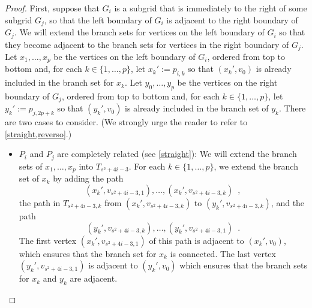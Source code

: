 \documentclass[kpfonts,lotsofwhite]{patmorin}
\theoremstyle{plain}
\theoremstyle{definition}
\begin{document}
\begin{proof}
  First, suppose that $G_i$ is a subgrid that is immediately to the right of some subgrid $G_j$, so that the left boundary of $G_i$ is adjacent to the right boundary of $G_j$.  We will extend the branch sets for vertices on the left boundary of $G_i$ so that they become adjacent to the branch sets for vertices in the right boundary of $G_j$. Let $x_1,\ldots,x_p$ be the vertices on the left boundary of $G_i$, ordered from top to bottom and, for each $k\in\{1,\ldots,p\}$, let $x_k':=p_{i,k}$ so that $(x_k',v_0)$ is already included in the branch set for $x_k$.  Let $y_0,\ldots,y_p$ be the vertices on the right boundary of $G_j$, ordered from top to bottom and, for each $k\in\{1,\ldots,p\}$, let $y_k':=p_{j,2p+k}$ so that $(y_k',v_0)$ is already included in the branch set of $y_k$. There are two cases to consider.  (We strongly urge the reader to refer to \cref{straight,reverso}.)

  \begin{itemize}
    \item $P_i$ and $P_j$ are completely related (see \cref{straight}): We will extend the branch sets of $x_1,\ldots,x_p$ into $T_{s^2+4i-3}$.  For each $k\in\{1,\ldots,p\}$, we extend the branch set of $x_k$ by adding the path
    \[
      (x_k',v_{s^2+4i-3,1}),\ldots,(x_k',v_{s^2+4i-3,k}) \enspace ,
    \]
    the path in $T_{s^2+4i-3,k}$ from $(x_k',v_{s^2+4i-3,k})$ to $(y_k',v_{s^2+4i-3,k})$, and the path
    \[
      (y_k',v_{s^2+4i-3,k}),\ldots,(y_k',v_{s^2+4i-3,1}) \enspace .
    \]
    The first vertex $(x_k',v_{s^2+4i-3,1})$ of this path is adjacent to $(x_k',v_0)$, which ensures that the branch set for $x_k$ is connected.  The last vertex $(y_k',v_{s^2+4i-3,1})$ is adjacent to $(y_k',v_0)$ which ensures that the branch sets for $x_k$ and $y_k$ are adjacent.


\end{itemize}
\end{proof}
\end{document}
